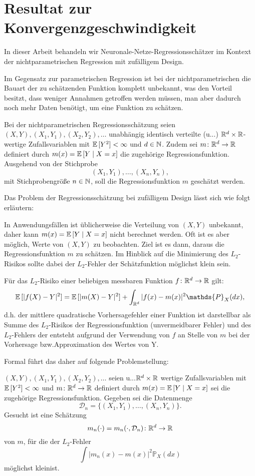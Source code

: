 \chapter{Resultat zur Konvergenzgeschwindigkeit}
\label{chap:3}

In dieser Arbeit behandeln wir Neuronale-Netze-Regressionsschätzer im Kontext der nichtparametrischen Regression mit zufälligem Design. 

Im Gegensatz zur parametrischen Regression ist bei der nichtparametrischen die Bauart der zu schätzenden Funktion komplett unbekannt, was den Vorteil besitzt, dass weniger Annahmen getroffen werden müssen, man aber dadurch noch mehr Daten benötigt, um eine Funktion zu schätzen.

Bei der nichtparametrischen Regressionsschätzung seien $(X, Y), (X_1, Y_1), (X_2, Y_2), \dots$ unabhängig identisch verteilte (u.\@i.\@v.\@) $\mathbb{R}^d \times \mathbb{R}$-wertige Zufallsvariablen mit $\mathbb{E}\,[Y^2] < \infty$ und $d \in \mathbb{N}$. Zudem sei $m\colon \mathbb{R}^d \to \mathbb{R}$ definiert durch $m(x) = \mathbb{E}\,[Y \mid X = x]$ die zugehörige Regressionsfunktion. Ausgehend von der Stichprobe
$$ (X_1, Y_1),\dots,(X_n, Y_n),$$ 
mit Stichprobengröße $n \in \mathbb{N}$, soll die Regressionsfunktion $m$ geschätzt werden.

Das Problem der Regressionsschätzung bei zufälligem Design lässt sich wie folgt erläutern: 

In Anwendungsfällen ist üblicherweise die Verteilung von $(X, Y)$ unbekannt, daher kann $m(x) = \mathbb{E}\,[Y \mid X = x]$ nicht berechnet werden. Oft ist es aber möglich, Werte von $(X, Y)$ zu beobachten. Ziel ist es dann, daraus die Regressionsfunktion $m$ zu schätzen. Im Hinblick auf die Minimierung des $L_2$-Risikos sollte dabei der $L_2$-Fehler der Schätzfunktion möglichst klein sein. 

Für das $L_2$-Risiko einer beliebigen messbaren Funktion $f\colon \mathbb{R}^d \to \mathbb{R}$  gilt:
$$\E[|f(X) - Y|^2] = \E[|m(X) - Y|^2] + \int_{\R^d}|f(x) - m(x)|^2 \mathds{P}_X (dx),$$
d.h. der mittlere quadratische Vorhersagefehler einer Funktion ist darstellbar als Summe des $L_2$-Risikos der Regressionsfunktion (unvermeidbarer Fehler) und des $L_2$-Fehlers der entsteht aufgrund der Verwendung von $f$ an Stelle von $m$ bei der Vorhersage bzw.\@ Approximation des Wertes von Y.

Formal führt das daher auf folgende Problemstellung:

$(X, Y), (X_1, Y_1), (X_2, Y_2), \dots$ seien u.\@i.\@v.\@ $\mathbb{R}^d \times \mathbb{R}$ wertige Zufallsvariablen mit $\mathbb{E}\,[Y^2] < \infty$ und $m\colon\mathbb{R}^d \to \mathbb{R}$ definiert durch $m(x) = \mathbb{E}\,[Y \mid X = x]$ sei die zugehörige Regressionsfunktion. Gegeben sei die Datenmenge 
$$ \mathcal{D}_n = \{(X_1, Y_1),\dots,(X_n, Y_n)\}.$$
Gesucht ist eine Schätzung 
$$m_n(\cdot) = m_n(\cdot, \mathcal{D}_n)\colon\mathbb{R}^d \to \mathbb{R} $$
von $m$, für die der $L_2$-Fehler 
$$\int |m_n(x) - m(x)|^2 \mathds{P}_X(dx)$$
möglichst \glqq klein\grqq\@ ist. \cite{györfi2002}


